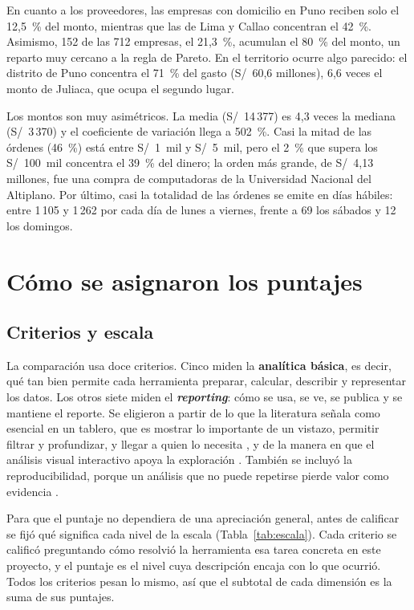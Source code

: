\documentclass[12pt,a4paper]{article}
\begin{document}
En cuanto a los proveedores, las empresas con domicilio en Puno reciben solo el 12,5~\% del monto,
mientras que las de Lima y Callao concentran el 42~\%. Asimismo, 152 de las 712 empresas, el 21,3~\%, acumulan el
80~\% del monto, un reparto muy cercano a la regla de Pareto. En el territorio ocurre algo parecido: el
distrito de Puno concentra el 71~\% del gasto (S/~60,6 millones), 6,6 veces el monto de Juliaca, que ocupa el
segundo lugar.

Los montos son muy asimétricos. La media (S/~14\,377) es 4,3 veces la mediana (S/~3\,370) y el coeficiente
de variación llega a 502~\%. Casi la mitad de las órdenes (46~\%) está entre S/~1~mil y S/~5~mil, pero el
2~\% que supera los S/~100~mil concentra el 39~\% del dinero; la orden más grande, de S/~4,13 millones, fue
una compra de computadoras de la Universidad Nacional del Altiplano. Por último, casi la totalidad de las órdenes
se emite en días hábiles: entre 1\,105 y 1\,262 por cada día de lunes a viernes, frente a 69 los sábados y
12 los domingos.

\section{Cómo se asignaron los puntajes}
\subsection{Criterios y escala}
La comparación usa doce criterios. Cinco miden la \textbf{analítica básica}, es decir, qué tan bien
permite cada herramienta preparar, calcular, describir y representar los datos. Los otros siete miden el
\textbf{\emph{reporting}}: cómo se usa, se ve, se publica y se mantiene el reporte. Se eligieron a partir
de lo que la literatura señala como esencial en un tablero, que es mostrar lo importante de un vistazo,
permitir filtrar y profundizar, y llegar a quien lo necesita \citep{yigitbasioglu2012,sarikaya2019,bach2023},
y de la manera en que el análisis visual interactivo apoya la exploración \citep{heer2012}. También se
incluyó la reproducibilidad, porque un análisis que no puede repetirse pierde valor como evidencia
\citep{peng2011,sandve2013}.

Para que el puntaje no dependiera de una apreciación general, antes de calificar se fijó qué significa cada
nivel de la escala (Tabla~\ref{tab:escala}). Cada criterio se calificó preguntando cómo resolvió la
herramienta esa tarea concreta en este proyecto, y el puntaje es el nivel cuya descripción encaja con lo
que ocurrió. Todos los criterios pesan lo mismo, así que el subtotal de cada dimensión es la suma de sus
puntajes.
\end{document}
